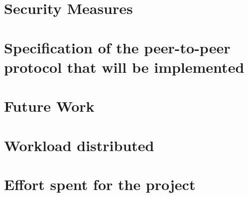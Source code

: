 \section{Security Measures}

\section{Specification of the peer-to-peer protocol that will be implemented}

\section{Future Work}

\section{Workload distributed}

\section{Effort spent for the project}